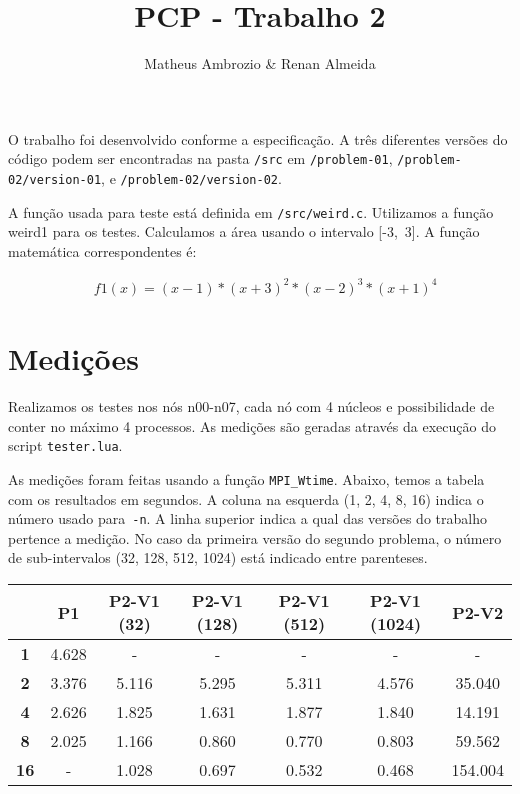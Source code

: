 \documentclass[12pt]{article}
\def\code#1{\texttt{#1}}
\begin{document}
\title{PCP - Trabalho 2}
\author{Matheus Ambrozio \& Renan Almeida}

\maketitle

O trabalho foi desenvolvido conforme a especificação. A três diferentes versões do código podem ser encontradas na pasta \code{/src} em \code{/problem-01}, \code{/problem-02/version-01}, e \code{/problem-02/version-02}.

A função usada para teste está definida em \code{/src/weird.c}. Utilizamos a função weird1 para os testes. Calculamos a área usando o intervalo [-3,~3]. A função matemática correspondentes é:

\begin{align}
& f1(x) = (x - 1) * (x + 3)^2 * (x - 2)^3 * (x + 1)^4
\end{align}

\section*{Medições}

Realizamos os testes nos nós n00-n07, cada nó com 4 núcleos e possibilidade de conter no máximo 4 processos. As medições são geradas através da execução do script \code{tester.lua}.

As medições foram feitas usando a função \code{MPI\_Wtime}. Abaixo, temos a tabela com os resultados em segundos. A coluna na esquerda (1, 2, 4, 8, 16) indica o número usado para~\code{-n}. A linha superior indica a qual das versões do trabalho pertence a medição. No caso da primeira versão do segundo problema, o número de sub-intervalos (32, 128, 512, 1024) está indicado entre parenteses.

\begin{table}[h]
\begin{tabular}{|c|c|c|c|c|c|c|}
\hline
    { }                     &
    {\textbf{P1}}           &
    {\textbf{P2-V1 (32)}}   &
    {\textbf{P2-V1 (128)}}  &
    {\textbf{P2-V1 (512)}}  &
    {\textbf{P2-V1 (1024)}} &
    {\textbf{P2-V2}}        \\
\hline
{\textbf{1}}  & 4.628   & -     & -     & -     & -     & -       \\ \hline
{\textbf{2}}  & 3.376   & 5.116	& 5.295	& 5.311	& 4.576	& 35.040  \\ \hline
{\textbf{4}}  & 2.626   & 1.825	& 1.631	& 1.877	& 1.840	& 14.191  \\ \hline
{\textbf{8}}  & 2.025   & 1.166	& 0.860	& 0.770	& 0.803	& 59.562  \\ \hline
{\textbf{16}} & -       & 1.028	& 0.697	& 0.532	& 0.468	& 154.004 \\ \hline
\end{tabular}
\end{table}
\end{document}
